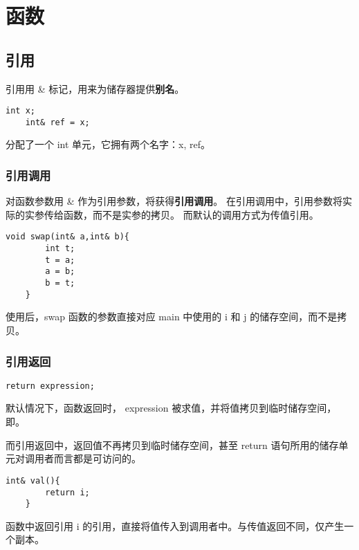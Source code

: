 \chapter{函数}
\newpage

\section{引用}

引用用 \& 标记，用来为储存器提供\textbf{别名}。

\begin{lstlisting}[frame=shadowbox]
    int x;
    int& ref = x;
\end{lstlisting}

分配了一个 int 单元，它拥有两个名字：x, ref。

\subsection{引用调用}

对函数参数用 \& 作为引用参数，将获得\textbf{引用调用}。
在引用调用中，引用参数将实际的实参传给函数，而不是实参的拷贝。
而默认的调用方式为传值引用。

\begin{lstlisting}[frame=shadowbox]
    void swap(int& a,int& b){
        int t;
        t = a;
        a = b;
        b = t;
    }
\end{lstlisting}

使用后，swap 函数的参数直接对应 main 中使用的 i 和 j 的储存空间，而不是拷贝。

\subsection{引用返回}

\begin{lstlisting}[frame=shadowbox]
    return expression;    
\end{lstlisting}

默认情况下，函数返回时， expression 被求值，并将值拷贝到临时储存空间，即。

而引用返回中，返回值不再拷贝到临时储存空间，甚至 return 语句所用的储存单元对调用者而言都是可访问的。

\begin{lstlisting}[frame=shadowbox]
    int& val(){
        return i;
    }    
\end{lstlisting}

函数中返回引用 i 的引用，直接将值传入到调用者中。与传值返回不同，仅产生一个副本。

